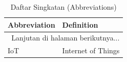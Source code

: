 \documentclass{elsinta}
\begin{document}
\begin{longtable}{|p{4cm}|p{11cm}|} %
    \caption{Daftar Singkatan (Abbreviations)} \label{tab:abbreviations3} \\
    \hline
    \textbf{Abbreviation} & \textbf{Definition} \\
    \hline
    \endhead %
    
    \hline 
    \multicolumn{2}{|r|}{Lanjutan di halaman berikutnya...} \\ 
    \endfoot %
    
    \hline
    \endlastfoot %

    IoT & Internet of Things \\
    

\end{longtable}
\end{document}
